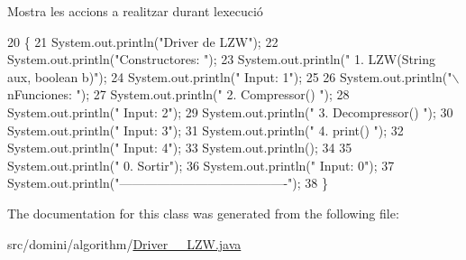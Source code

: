 Mostra les accions a realitzar durant l\textquotesingle{}execució 


\begin{DoxyCode}
20                                      \{
21         System.out.println(\textcolor{stringliteral}{"Driver de LZW"});
22         System.out.println(\textcolor{stringliteral}{"Constructores: "});
23         System.out.println(\textcolor{stringliteral}{"     1. LZW(String aux, boolean b)"});
24         System.out.println(\textcolor{stringliteral}{"     Input: 1"});
25 
26         System.out.println(\textcolor{stringliteral}{"\(\backslash\)nFunciones: "});
27         System.out.println(\textcolor{stringliteral}{"     2. Compressor() "});
28         System.out.println(\textcolor{stringliteral}{"     Input: 2"});
29         System.out.println(\textcolor{stringliteral}{"     3. Decompressor() "});
30         System.out.println(\textcolor{stringliteral}{"     Input: 3"});
31         System.out.println(\textcolor{stringliteral}{"     4. print() "});
32         System.out.println(\textcolor{stringliteral}{"     Input: 4"});
33         System.out.println();
34 
35         System.out.println(\textcolor{stringliteral}{"     0. Sortir"});
36         System.out.println(\textcolor{stringliteral}{"     Input: 0"});
37         System.out.println(\textcolor{stringliteral}{"----------------------------------------"});
38     \}
\end{DoxyCode}


The documentation for this class was generated from the following file\+:\begin{DoxyCompactItemize}
\item 
src/domini/algorithm/\hyperlink{Driver____LZW_8java}{Driver\+\_\+\+\_\+\+L\+Z\+W.\+java}\end{DoxyCompactItemize}

